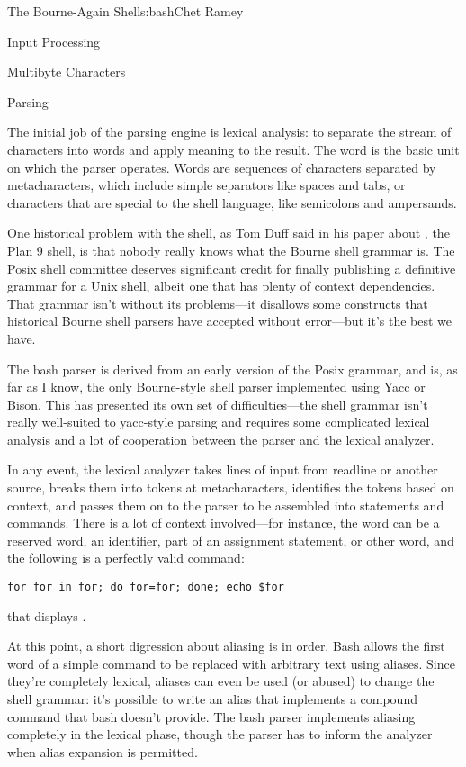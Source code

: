 \begin{aosachapter}{The Bourne-Again Shell}{s:bash}{Chet Ramey}
\begin{aosasect1}{Input Processing}
\begin{aosasect2}{Multibyte Characters}
\end{aosasect2}

\end{aosasect1}

\begin{aosasect1}{Parsing}

The initial job of the parsing engine is lexical analysis: to separate
the stream of characters into words and apply meaning to the result.
The word is the basic unit on which the parser operates.  Words are
sequences of characters separated by metacharacters, which include
simple separators like spaces and tabs, or characters that are special
to the shell language, like semicolons and ampersands.

One historical problem with the shell, as Tom Duff said in his paper
about , the Plan 9 shell, is that nobody really knows what
the Bourne shell grammar is.  The Posix shell committee deserves
significant credit for finally publishing a definitive grammar for a
Unix shell, albeit one that has plenty of context dependencies.  That
grammar isn't without its problems---it disallows some constructs that
historical Bourne shell parsers have accepted without error---but it's
the best we have.

The bash parser is derived from an early version of the Posix grammar,
and is, as far as I know, the only Bourne-style shell parser
implemented using Yacc or Bison.  This has presented its own set of
difficulties---the shell grammar isn't really well-suited to
yacc-style parsing and requires some complicated lexical analysis and
a lot of cooperation between the parser and the lexical analyzer.

In any event, the lexical analyzer takes lines of input from readline
or another source, breaks them into tokens at metacharacters,
identifies the tokens based on context, and passes them on to the
parser to be assembled into statements and commands.  There is a lot
of context involved---for instance, the word  can be a
reserved word, an identifier, part of an assignment statement, or
other word, and the following is a perfectly valid command:

\begin{verbatim}
for for in for; do for=for; done; echo $for
\end{verbatim}

\noindent that displays .

At this point, a short digression about aliasing is in order.  Bash
allows the first word of a simple command to be replaced with
arbitrary text using aliases.  Since they're completely lexical,
aliases can even be used (or abused) to change the shell grammar: it's
possible to write an alias that implements a compound command that
bash doesn't provide.  The bash parser implements aliasing completely
in the lexical phase, though the parser has to inform the analyzer
when alias expansion is permitted.


\end{aosasect1}
\end{aosachapter}

